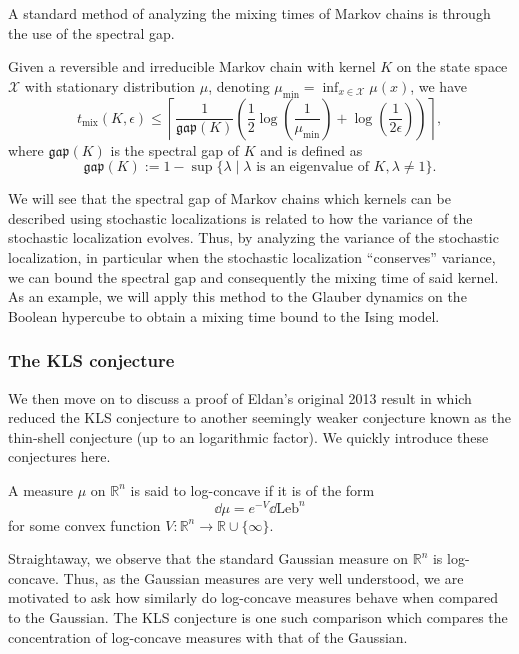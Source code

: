 A standard method of analyzing the mixing times of Markov chains is through the use of the spectral gap. 

\begin{theorem}\label{thm:levin}
  Given a reversible and irreducible Markov chain with kernel \(K\) on the state space \(\mathcal{X}\) 
  with stationary distribution \(\mu\), denoting \(\mu_{\min} = \inf_{x \in \mathcal{X}} \mu(x)\), we have 
  \[t_{\text{mix}}(K, \epsilon) \le \left\lceil\frac{1}{\mathfrak{gap}(K)}
  \left(\frac{1}{2}\log\left(\frac{1}{\mu_{\min}}\right) + \log\left(\frac{1}{2\epsilon}\right)\right)\right\rceil,\]
  where \(\mathfrak{gap}(K)\) is the spectral gap of \(K\) and is defined as
  \[\mathfrak{gap}(K) := 1 - \sup\{\lambda \mid \lambda \text{ is an eigenvalue of } K, \lambda \neq 1\}.\]
\end{theorem}

We will see that the spectral gap of Markov chains which kernels can be described using stochastic localizations 
is related to how the variance of the stochastic localization evolves. Thus, by analyzing the variance of 
the stochastic localization, in particular when the stochastic localization ``conserves'' variance, we can 
bound the spectral gap and consequently the mixing time of said kernel. As an example, we will apply this 
method to the Glauber dynamics on the Boolean hypercube to obtain a mixing time bound to the Ising model. 

\subsubsection{The KLS conjecture}

We then move on to discuss a proof of Eldan's original 2013 result in \cite{Eldan_2013} which reduced 
the KLS conjecture to another seemingly weaker conjecture known as the thin-shell conjecture (up to an logarithmic factor). 
We quickly introduce these conjectures here.

\begin{definition}
  A measure \(\mu\) on \(\mathbb{R}^n\) is said to log-concave if it is of the form 
  \[\dd \mu = e^{-V}\dd\text{Leb}^n\] 
  for some convex function \(V : \mathbb{R}^n \to \mathbb{R} \cup \{\infty\}\).
\end{definition}

Straightaway, we observe that the standard Gaussian measure on \(\mathbb{R}^n\) is log-concave.
Thus, as the Gaussian measures are very well understood, we are motivated to ask how similarly do log-concave 
measures behave when compared to the Gaussian. The KLS conjecture is one such comparison which compares the 
concentration of log-concave measures with that of the Gaussian.

